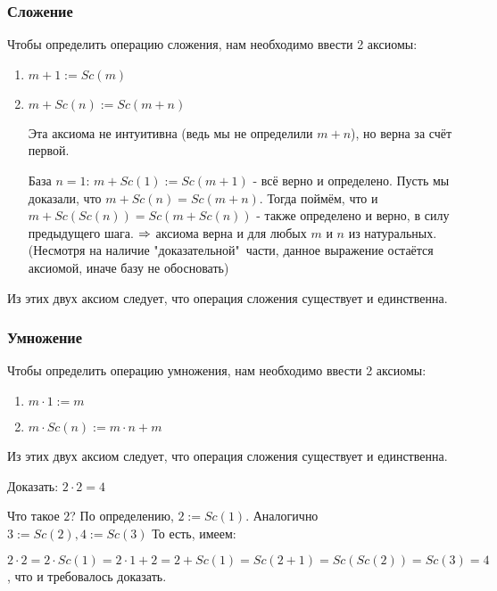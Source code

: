 \subsubsection*{Сложение}

Чтобы определить операцию сложения, нам необходимо ввести 2 аксиомы:
\begin{enumerate}
    \item $m + 1 := Sc(m)$
    \item $m + Sc(n) := Sc(m + n)$
    \begin{note}
        Эта аксиома не интуитивна (ведь мы не определили $m + n$), но верна за счёт первой.
        
        База $n = 1$: $m + Sc(1) := Sc(m + 1)$ - всё верно и определено.
        Пусть мы доказали, что $m + Sc(n) = Sc(m + n)$. Тогда поймём, что и
        $m + Sc(Sc(n)) = Sc(m + Sc(n))$ - также определено и верно, в силу предыдущего шага.
        $\Rightarrow$ аксиома верна и для любых $m$ и $n$ из натуральных. (Несмотря на наличие "доказательной"\ части, данное выражение остаётся аксиомой, иначе базу не обосновать)
    \end{note}
\end{enumerate}

Из этих двух аксиом следует, что операция сложения существует и единственна.

\subsubsection*{Умножение}

Чтобы определить операцию умножения, нам необходимо ввести 2 аксиомы:
\begin{enumerate}
    \item $m \cdot 1 := m$
    \item $m \cdot Sc(n) := m \cdot n + m$
\end{enumerate}

Из этих двух аксиом следует, что операция сложения существует и единственна.

\begin{example}
    Доказать: $2 \cdot 2 = 4$
    
    Что такое $2$? По определению, $2 := Sc(1)$. Аналогично $3 := Sc(2), 4 := Sc(3)$
    То есть, имеем:
    
    $2 \cdot 2 = 2 \cdot Sc(1) = 2 \cdot 1 + 2 = 2 + Sc(1) = Sc(2 + 1) = Sc(Sc(2)) = Sc(3) = 4$, что и требовалось доказать.
\end{example}

